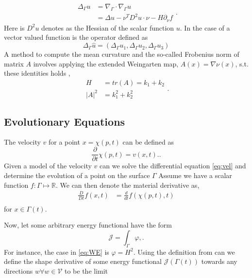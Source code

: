 \begin{equation*}
    \begin{split}
 \Delta _{\Gamma } u  & = \nabla _{\Gamma } \cdot  \nabla _{\Gamma }u \\
 &=  \Delta u  - \nu ^{T} D^2 u \cdot \nu - H \partial _{\nu } f
    \end{split}
.\end{equation*}
Here is $D^2u$ denotes as the Hessian of the scalar function $u$. In the case of a vector valued function is the operator defined as \[
\Delta _{\Gamma } \hat{u} = \left( \Delta _{\Gamma } u_{1}, \Delta _{\Gamma } u_{2}, \Delta _{\Gamma } u_{3} \right)
\]
A method to compute the mean curvature and the so-called Frobenius norm of matrix $A$ involves applying the
extended Weingarten map, $ A\left( x \right) = \nabla \nu \left( x \right) $, s.t. these identities holds \cite{kovacs2021convergent},
\begin{equation*}
    \begin{split}
    H & = tr(A) = k_{1} + k_{2} \\
    \left\lvert A \right\rvert^{2}  & = k_{1}^2 + k_{2}^2
    \end{split}
.\end{equation*}


\subsection{Evolutionary Equations}%
\label{sub:evolutionary_equations}

The velocity $v$ for a point $x = \chi \left( p,t \right) $ can be defined as
\begin{equation}
    \label{eq:vel}
\frac{\partial }{\partial  t}  \chi \left( p,t \right)  = v\left( x,t \right).
.\end{equation}
Given a model of the velocity $v$ can we solve the differential equation \eqref{eq:vel} and determine the evolution of a point on the surface $\Gamma $
Assume we have a scalar function $f: \Gamma \mapsto \mathbb{R}  $. We can then denote the material derivative as,
\[
    \begin{split}
\frac{D}{Dt}  f\left( x,t \right)  & = \frac{d}{dt} f \left( \chi \left( p,t \right) , t \right) \\
    \end{split}
\]
for $x \in \Gamma \left( t \right)  $.



Now, let some arbitrary energy functional have the form
\[
\mathcal{J} = \int_{\Gamma }^{} \varphi,.
\]
For instance, the case in \eqref{eq:WE} is $\varphi = H ^2$.
Using the definition from \cite{bonito2010parametric, troltzsch2010optimal} can we define the shape derivative of some energy
functional $\mathcal{J} \left( \Gamma \left( t \right)  \right)  $ towards any directions $ w \forall w \in \mathcal{V}  $  to be the limit

